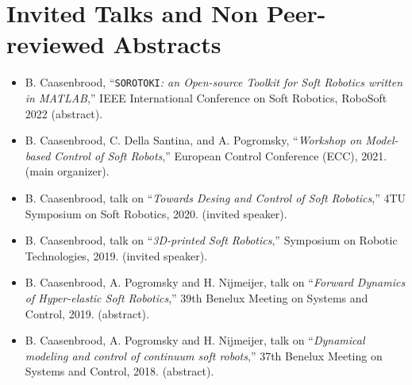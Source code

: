 \section*{Invited Talks and Non Peer-reviewed Abstracts}
\begin{itemize}[leftmargin=4mm]
\item B. Caasenbrood, “\texttt{SOROTOKI}\textit{: an Open-source Toolkit for Soft Robotics written in MATLAB},”  IEEE International Conference on Soft Robotics, RoboSoft 2022 (abstract).
\item B. Caasenbrood, C. Della Santina, and A. Pogromsky, “\textit{Workshop on Model-based Control of Soft Robots},” European Control Conference (ECC), 2021. (main organizer).
\item B. Caasenbrood, talk on  “\textit{Towards Desing and Control of Soft Robotics},” 4TU Symposium on Soft Robotics, 2020. (invited speaker).
\item B. Caasenbrood, talk on  “\textit{3D-printed Soft Robotics},” Symposium on Robotic Technologies, 2019. (invited speaker).
\item B. Caasenbrood, A. Pogromsky and H. Nijmeijer, talk on  “\textit{Forward Dynamics of Hyper-elastic Soft Robotics},” 39th Benelux Meeting on Systems and Control, 2019. (abstract).
\item B. Caasenbrood, A. Pogromsky and H. Nijmeijer, talk on  “\textit{Dynamical modeling and control of continuum soft robots},” 37th Benelux Meeting on Systems and Control, 2018. (abstract).
\end{itemize}


